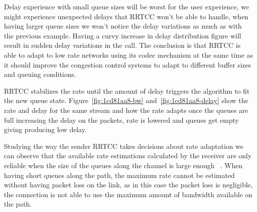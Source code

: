 Delay experience with small queue sizes will be worst for the user experience, we might experience unexpected delays that RRTCC won't be able to handle, when having larger queue sizes we won't notice the delay variations as much as with the previous example. Having a curvy increase in delay distribution figure will result in sudden delay variations in the call. The conclusion is that RRTCC is able to adapt to low rate networks using its codec mechanism at the same time as it should improve the congestion control systems to adapt to different buffer sizes and queuing conditions. 

RRTCC stabilizes the rate until the amount of delay triggers the algorithm to fit the new queue state. Figure~\ref{fig:1cd81aa8-bw} and~\ref{fig:1cd81aa8-delay} show the rate and delay for the same stream and how the rate adapts once the queues are full increasing the delay on the packets, rate is lowered and queues get empty giving producing low delay.

Studying the way the sender RRTCC takes decisions about rate adaptation we can observe that the available rate estimations calculated by the receiver are only reliable when the size of the queues along the channel is large enough~\cite{alvestrandCongestion2012} . When having short queues along the path, the maximum rate cannot be estimated without having packet loss on the link, as in this case the packet loss is negligible, the connection is not able to use the maximum amount of bandwidth available on the path.


